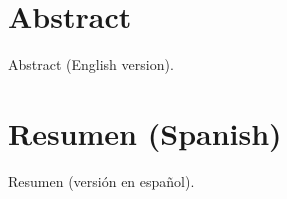 %
\chapter*{Abstract}
\label{sec:abstract}

Abstract (English version).

\chapter*{Resumen (Spanish)}
\label{sec:resumen}

Resumen (versión en español).